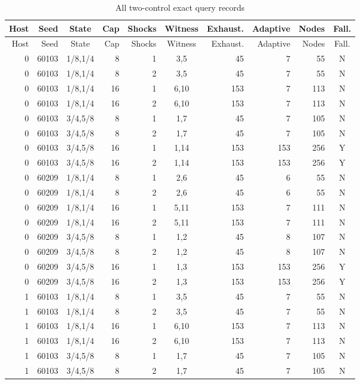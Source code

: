 \begingroup\small\setlength{\tabcolsep}{3pt}
\begin{longtable}{rrcrrcrrrc}
\caption{All two-control exact query records}\label{tab:multi-registry61}\\
\hline
Host & Seed & State & Cap & Shocks & Witness & Exhaust. & Adaptive & Nodes & Fall. \\
\hline\endfirsthead
\hline
Host & Seed & State & Cap & Shocks & Witness & Exhaust. & Adaptive & Nodes & Fall. \\
\hline\endhead
0 & 60103 & 1/8,1/4 & 8 & 1 & 3,5 & 45 & 7 & 55 & N \\
0 & 60103 & 1/8,1/4 & 8 & 2 & 3,5 & 45 & 7 & 55 & N \\
0 & 60103 & 1/8,1/4 & 16 & 1 & 6,10 & 153 & 7 & 113 & N \\
0 & 60103 & 1/8,1/4 & 16 & 2 & 6,10 & 153 & 7 & 113 & N \\
0 & 60103 & 3/4,5/8 & 8 & 1 & 1,7 & 45 & 7 & 105 & N \\
0 & 60103 & 3/4,5/8 & 8 & 2 & 1,7 & 45 & 7 & 105 & N \\
0 & 60103 & 3/4,5/8 & 16 & 1 & 1,14 & 153 & 153 & 256 & Y \\
0 & 60103 & 3/4,5/8 & 16 & 2 & 1,14 & 153 & 153 & 256 & Y \\
0 & 60209 & 1/8,1/4 & 8 & 1 & 2,6 & 45 & 6 & 55 & N \\
0 & 60209 & 1/8,1/4 & 8 & 2 & 2,6 & 45 & 6 & 55 & N \\
0 & 60209 & 1/8,1/4 & 16 & 1 & 5,11 & 153 & 7 & 111 & N \\
0 & 60209 & 1/8,1/4 & 16 & 2 & 5,11 & 153 & 7 & 111 & N \\
0 & 60209 & 3/4,5/8 & 8 & 1 & 1,2 & 45 & 8 & 107 & N \\
0 & 60209 & 3/4,5/8 & 8 & 2 & 1,2 & 45 & 8 & 107 & N \\
0 & 60209 & 3/4,5/8 & 16 & 1 & 1,3 & 153 & 153 & 256 & Y \\
0 & 60209 & 3/4,5/8 & 16 & 2 & 1,3 & 153 & 153 & 256 & Y \\
1 & 60103 & 1/8,1/4 & 8 & 1 & 3,5 & 45 & 7 & 55 & N \\
1 & 60103 & 1/8,1/4 & 8 & 2 & 3,5 & 45 & 7 & 55 & N \\
1 & 60103 & 1/8,1/4 & 16 & 1 & 6,10 & 153 & 7 & 113 & N \\
1 & 60103 & 1/8,1/4 & 16 & 2 & 6,10 & 153 & 7 & 113 & N \\
1 & 60103 & 3/4,5/8 & 8 & 1 & 1,7 & 45 & 7 & 105 & N \\
1 & 60103 & 3/4,5/8 & 8 & 2 & 1,7 & 45 & 7 & 105 & N \\

\end{longtable}
